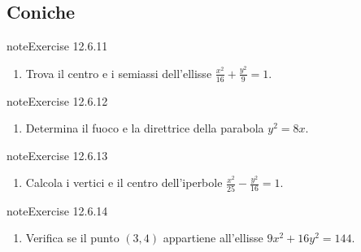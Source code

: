 \documentclass[letterpaper,10pt,italian]{jupyterBook}
\begin{document}
\subsection{Coniche}
\label{\detokenize{ch/analytic_geometry/analytic_geometry_2d/problems:coniche}} \label{exercise:ch/analytic_geometry/analytic_geometry_2d/problems-exercise-10}

\begin{sphinxadmonition}{note}{Exercise 12.6.11}


\begin{enumerate}
%
\setcounter{enumi}{10}
\item {} 
\sphinxAtStartPar
Trova il centro e i semiassi dell’ellisse \( \frac{x^2}{16} + \frac{y^2}{9} = 1 \).

\end{enumerate}
\end{sphinxadmonition}
 \label{exercise:ch/analytic_geometry/analytic_geometry_2d/problems-exercise-11}

\begin{sphinxadmonition}{note}{Exercise 12.6.12}


\begin{enumerate}
%
\setcounter{enumi}{11}
\item {} 
\sphinxAtStartPar
Determina il fuoco e la direttrice della parabola \( y^2 = 8x \).

\end{enumerate}
\end{sphinxadmonition}
 \label{exercise:ch/analytic_geometry/analytic_geometry_2d/problems-exercise-12}

\begin{sphinxadmonition}{note}{Exercise 12.6.13}


\begin{enumerate}
%
\setcounter{enumi}{12}
\item {} 
\sphinxAtStartPar
Calcola i vertici e il centro dell’iperbole \( \frac{x^2}{25} - \frac{y^2}{16} = 1 \).

\end{enumerate}
\end{sphinxadmonition}
 \label{exercise:ch/analytic_geometry/analytic_geometry_2d/problems-exercise-13}

\begin{sphinxadmonition}{note}{Exercise 12.6.14}


\begin{enumerate}
%
\setcounter{enumi}{13}
\item {} 
\sphinxAtStartPar
Verifica se il punto \( (3, 4) \) appartiene all’ellisse \( 9x^2 + 16y^2 = 144 \).

\end{enumerate}
\end{sphinxadmonition}
 \label{exercise:ch/analytic_geometry/analytic_geometry_2d/problems-exercise-14}
\end{document}
